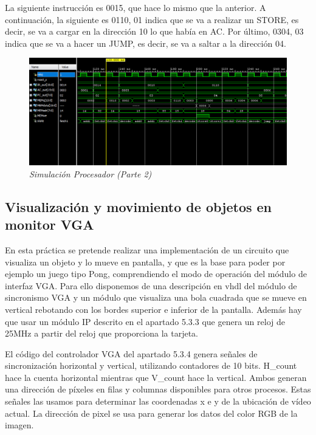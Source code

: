 La siguiente instrucción es 0015, que hace lo mismo que la anterior. A continuación, 
la siguiente es 0110, 01 indica que se va a realizar un STORE, es decir, se va a cargar en la dirección 10 lo que había en AC. Por 
último, 0304, 03 indica que se va a hacer un JUMP, es decir, se va a saltar a la dirección 04.

\begin{figure}[H]
    \centering
    \includegraphics[width = 1\textwidth]{imagenes/procesador1.png}
    \caption{\textit{Simulación Procesador (Parte 2)}}\label{procesador1}
\end{figure}

\subsection{Visualización y movimiento de objetos en monitor VGA}

En esta práctica se pretende realizar una implementación de un circuito que visualiza un objeto y lo mueve en pantalla, y que 
es la base para poder por ejemplo un juego tipo Pong, comprendiendo el modo de operación 
del módulo de interfaz VGA. Para ello disponemos de una descripción en vhdl del módulo de sincronismo VGA y un módulo que visualiza 
una bola cuadrada que se mueve en vertical rebotando con los bordes superior e inferior de la pantalla. Además hay que usar un módulo IP 
descrito en el apartado 5.3.3 que genera un reloj de 25MHz a partir del reloj que proporciona la tarjeta.

El código del controlador VGA del apartado 5.3.4 genera señales de sincronización horizontal y vertical, utilizando contadores de 10 
bits. H\_count hace la cuenta horizontal mientras que V\_count hace la vertical. Ambos generan una dirección de píxeles 
en filas y columnas disponibles para otros procesos. Estas señales las usamos para determinar las coordenadas x e y de 
la ubicación de vídeo actual. La dirección de pixel se usa para generar los datos del color RGB de la imagen. 

